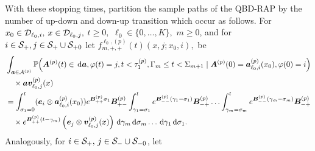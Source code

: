 With these stopping times, partition the sample paths of the QBD-RAP by the number of up-down and down-up transition which occur as follows. For \(x_0\in\mathcal{D}_{\ell_0,i},\) \(x\in\mathcal{D}_{\ell_0,j},\) \(t\geq0,\) \(\ell_0\in\{0,\dots,K\},\) \(m\geq 0\), and for \(i\in\mathcal{S}_+,j\in\mathcal S_+\cup\mathcal S_{+0}\) let \(f^{\ell_0,(p)}_{m,+,+}(t)( x,j; x_0,i) ,\) be 
\begin{align}
	&\int_{\boldsymbol a \in\mathcal A^{(p)}}\mathbb P\Big(\boldsymbol A^{(p)}(t)\in \, \mathrm{d} \boldsymbol a, \varphi(t) = j, t<\tau_1^{(p)}, \Gamma_m\leq t<\Sigma_{m+1} \nonumber
	\mid \boldsymbol A^{(p)}(0) = \boldsymbol   a_{\ell_0,i}^{(p)}(x_0), \varphi(0) = i\Big)
	\\&\quad \times \boldsymbol a{\boldsymbol v}_{\ell_0,j}^{(p)}(x) \nonumber
	\\
	&=\int_{\sigma_1=0}^t (\boldsymbol e_i\otimes \boldsymbol  a_{\ell_0,i}^{(p)}(x_0)) e^{\boldsymbol{B}^{(p)}_{++}\sigma_1}\boldsymbol{B}^{(p)}_{+-}	\nonumber
	\int_{\gamma_1=\sigma_1}^{t} e^{\boldsymbol{B}^{(p)}_{--}(\gamma_1-\sigma_1)}\boldsymbol{B}^{(p)}_{-+}
	\hdots 
	 \int_{\gamma_m=\sigma_{m}}^{t} e^{\boldsymbol{B}^{(p)}_{--}(\gamma_m-\sigma_{m})}\boldsymbol{B}^{(p)}_{-+}\\&\quad\times
	e^{\boldsymbol{B}^{(p)}_{++}(t-\gamma_m)}\left(\boldsymbol e_j  \otimes {\boldsymbol v}_{\ell_0,j}^{(p)}(x)\right) 
	\, \mathrm{d} \gamma_m\, \mathrm{d} \sigma_m\dots \, \mathrm{d} \gamma_1\, \mathrm{d} \sigma_1 . \label{eqn: approx end conv}
\end{align}
Analogously, for \(i\in\mathcal S_+ ,\,j\in\mathcal{S}_{-}\cup\mathcal S_{-0}\), let 
